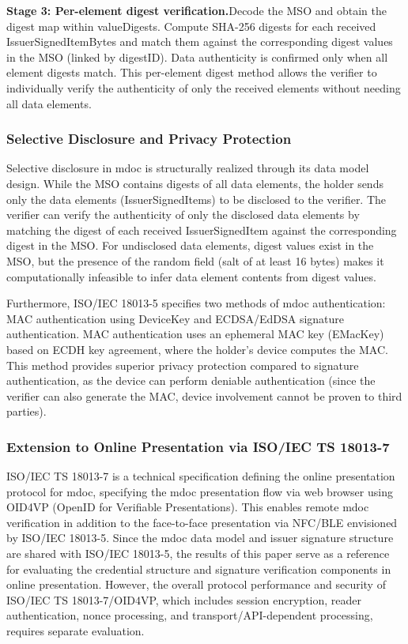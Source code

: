 \documentclass[conference]{IEEEtran}
\begin{document}
\textbf{Stage 3: Per-element digest verification.}Decode the MSO and obtain the digest map within valueDigests. Compute SHA-256 digests for each received IssuerSignedItemBytes and match them against the corresponding digest values in the MSO (linked by digestID). Data authenticity is confirmed only when all element digests match. This per-element digest method allows the verifier to individually verify the authenticity of only the received elements without needing all data elements.

\subsubsection{Selective Disclosure and Privacy Protection}

Selective disclosure in mdoc is structurally realized through its data model design. While the MSO contains digests of all data elements, the holder sends only the data elements (IssuerSignedItems) to be disclosed to the verifier. The verifier can verify the authenticity of only the disclosed data elements by matching the digest of each received IssuerSignedItem against the corresponding digest in the MSO. For undisclosed data elements, digest values exist in the MSO, but the presence of the random field (salt of at least 16 bytes) makes it computationally infeasible to infer data element contents from digest values.

Furthermore, ISO/IEC 18013-5 specifies two methods of mdoc authentication: MAC authentication using DeviceKey and ECDSA/EdDSA signature authentication. MAC authentication uses an ephemeral MAC key (EMacKey) based on ECDH key agreement, where the holder's device computes the MAC. This method provides superior privacy protection compared to signature authentication, as the device can perform deniable authentication (since the verifier can also generate the MAC, device involvement cannot be proven to third parties).

\subsubsection{Extension to Online Presentation via ISO/IEC TS 18013-7}

ISO/IEC TS 18013-7 is a technical specification defining the online presentation protocol for mdoc, specifying the mdoc presentation flow via web browser using OID4VP (OpenID for Verifiable Presentations). This enables remote mdoc verification in addition to the face-to-face presentation via NFC/BLE envisioned by ISO/IEC 18013-5. Since the mdoc data model and issuer signature structure are shared with ISO/IEC 18013-5, the results of this paper serve as a reference for evaluating the credential structure and signature verification components in online presentation. However, the overall protocol performance and security of ISO/IEC TS 18013-7/OID4VP, which includes session encryption, reader authentication, nonce processing, and transport/API-dependent processing, requires separate evaluation.
\end{document}
